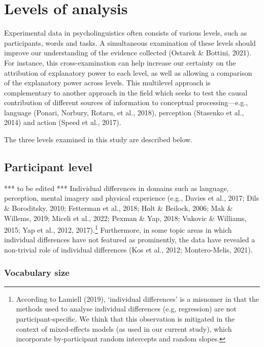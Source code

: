 \documentclass[
  12pt,
  man,floatsintext]{apa7}
\begin{document}
\hypertarget{levels-of-analysis}{%
\section{Levels of analysis}\label{levels-of-analysis}}

Experimental data in psycholinguistics often consists of various levels, such as participants, words and tasks. A simultaneous examination of these levels should improve our understanding of the evidence collected (Ostarek \& Bottini, 2021). For instance, this cross-examination can help increase our certainty on the attribution of explanatory power to each level, as well as allowing a comparison of the explanatory power across levels. This multilevel approach is complementary to another approach in the field which seeks to test the causal contribution of different sources of information to conceptual processing---e.g., language (Ponari, Norbury, Rotaru, et al., 2018), perception (Stasenko et al., 2014) and action (Speed et al., 2017).

The three levels examined in this study are described below.

\hypertarget{participant-level}{%
\subsection{Participant level}\label{participant-level}}

*** to be edited *** Individual differences in domains such as language, perception, mental imagery and physical experience (e.g., Davies et al., 2017; Dils \& Boroditsky, 2010; Fetterman et al., 2018; Holt \& Beilock, 2006; Mak \& Willems, 2019; Miceli et al., 2022; Pexman \& Yap, 2018; Vukovic \& Williams, 2015; Yap et al., 2012, 2017).\footnote{According to Lamiell (2019), `individual differences' is a misnomer in that the methods used to analyse individual differences (e.g, regression) are not participant-specific. We think that this observation is mitigated in the context of mixed-effects models (as used in our current study), which incorporate by-participant random intercepts and random slopes.} Furthermore, in some topic areas in which individual differences have not featured as prominently, the data have revealed a non-trivial role of individual differences (Kos et al., 2012; Montero-Melis, 2021).

\hypertarget{vocabulary-size}{%
\subsubsection{Vocabulary size}\label{vocabulary-size}}
\end{document}
